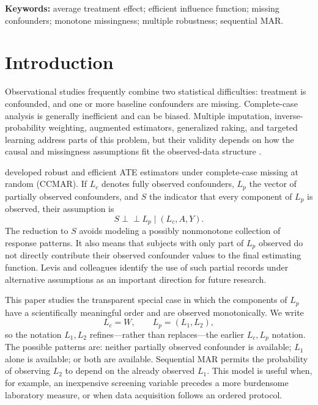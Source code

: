 \documentclass[11pt]{article}
\theoremstyle{definition}
\newcommand{\indep}{\perp\!\!\!\perp}
\newcommand{\1}{\mathbf{1}}
\begin{document}
\noindent\textbf{Keywords:} average treatment effect; efficient influence function; missing confounders; monotone missingness; multiple robustness; sequential MAR.

\section{Introduction}

Observational studies frequently combine two statistical difficulties: treatment is confounded, and one or more baseline confounders are missing. Complete-case analysis is generally inefficient and can be biased. Multiple imputation, inverse-probability weighting, augmented estimators, generalized raking, and targeted learning address parts of this problem, but their validity depends on how the causal and missingness assumptions fit the observed-data structure \citep{bang2005,williamson2012,seaman2014,levis2025,benz2025,williamson2026,wen2026}.

\citet{levis2025} developed robust and efficient ATE estimators under complete-case missing at random (CCMAR). If $L_c$ denotes fully observed confounders, $L_p$ the vector of partially observed confounders, and $S$ the indicator that every component of $L_p$ is observed, their assumption is
\[
S\indep L_p\mid (L_c,A,Y).
\]
The reduction to $S$ avoids modeling a possibly nonmonotone collection of response patterns. It also means that subjects with only part of $L_p$ observed do not directly contribute their observed confounder values to the final estimating function. Levis and colleagues identify the use of such partial records under alternative assumptions as an important direction for future research.

This paper studies the transparent special case in which the components of $L_p$ have a scientifically meaningful order and are observed monotonically. We write
\[
L_c=W,\qquad L_p=(L_1,L_2),
\]
so the notation $L_1,L_2$ refines---rather than replaces---the earlier $L_c,L_p$ notation. The possible patterns are: neither partially observed confounder is available; $L_1$ alone is available; or both are available. Sequential MAR permits the probability of observing $L_2$ to depend on the already observed $L_1$. This model is useful when, for example, an inexpensive screening variable precedes a more burdensome laboratory measure, or when data acquisition follows an ordered protocol.
\end{document}
